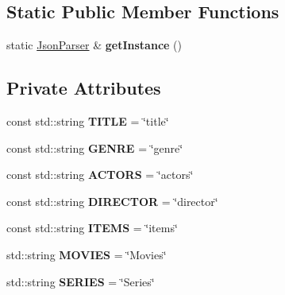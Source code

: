 \subsection*{Static Public Member Functions}
\begin{DoxyCompactItemize}
\item 
\mbox{\label{classJsonParser_a31933a8a827a8377b5edbf01bd4a66ac}} 
static \hyperlink{classJsonParser}{Json\+Parser} \& {\bfseries get\+Instance} ()
\end{DoxyCompactItemize}
\subsection*{Private Attributes}
\begin{DoxyCompactItemize}
\item 
\mbox{\label{classJsonParser_a1fd58d33ddee29187d335f9f0cf0a0db}} 
const std\+::string {\bfseries T\+I\+T\+LE} = \char`\"{}title\char`\"{}
\item 
\mbox{\label{classJsonParser_a32223885ef9b529e156fb47ea847abff}} 
const std\+::string {\bfseries G\+E\+N\+RE} = \char`\"{}genre\char`\"{}
\item 
\mbox{\label{classJsonParser_ad47cedc2b9fc664735a9fdcbc9869033}} 
const std\+::string {\bfseries A\+C\+T\+O\+RS} = \char`\"{}actors\char`\"{}
\item 
\mbox{\label{classJsonParser_a8d6aa8c21e729236fd180f051358e9c9}} 
const std\+::string {\bfseries D\+I\+R\+E\+C\+T\+OR} = \char`\"{}director\char`\"{}
\item 
\mbox{\label{classJsonParser_a3fcbbf58d72ac41ef6caf67cb34b7864}} 
const std\+::string {\bfseries I\+T\+E\+MS} = \char`\"{}items\char`\"{}
\item 
\mbox{\label{classJsonParser_ab209a873c5fa7850d80e9ddc9bab04c0}} 
std\+::string {\bfseries M\+O\+V\+I\+ES} = \char`\"{}Movies\char`\"{}
\item 
\mbox{\label{classJsonParser_a00fe1d9101a48ef93ee8eeabcc059aae}} 
std\+::string {\bfseries S\+E\+R\+I\+ES} = \char`\"{}Series\char`\"{}

\end{DoxyCompactItemize}
